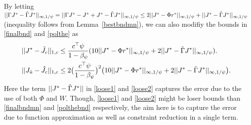 \begin{note}
By letting $||\Gamma J^*-\hat{\Gamma} J^*||_{\infty,1/\psi}=||\Gamma J^*-J^*+J^*-\hat{\Gamma} J^*||_{\infty,1/\psi}\leq 2||J^*-\Phi r^*||_{\infty,1/\psi}+||J^*-\hat{\Gamma} J^*||_{\infty,1/\psi}$ (inequality follows from Lemma~\ref{bestbndmn}), we can also modifiy the bounds in \eqref{finalbnd} and \eqref{polthe} as
\begin{align}
\label{loose1}||J^*-\hj||_{1,c}&\leq\frac{c^\top\psi}{1-\beta_\psi}(10 ||J^*-\Phi r^*||_{\mn}
+2||J^*-\hg J^*||_{\mn}).\\
\label{loose2}||J_{\hu}-\hj||_{1,c}&\leq 2\big(\frac{c^\top \psi}{1-\beta_{\psi}}\big)^2 \big(10 ||J^*-\Phi r^*||_{\mn}
+2||J^*-\hg J^*||_{\mn}\big).
\end{align}
Here the term $||J^*-\hat{\Gamma} J^*||$ in \eqref{loose1} and \eqref{loose2} captures the error due to the use of both $\Phi$ and $W$. Though, \eqref{loose1} and \eqref{loose2} might be loser bounds than \eqref{finalbndmn} and \eqref{polthebnd} respectively, the aim here is to capture the error due to function approximation as well as constraint reduction in a single term.
\end{note}

